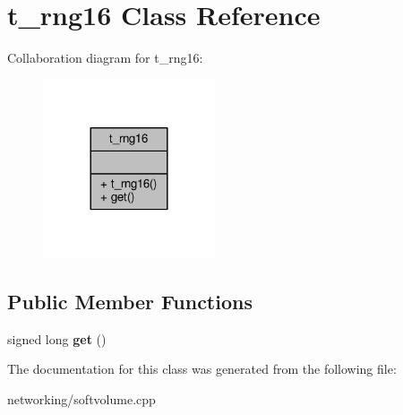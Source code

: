 \hypertarget{classt__rng16}{}\section{t\+\_\+rng16 Class Reference}
\label{classt__rng16}


Collaboration diagram for t\+\_\+rng16\+:
\nopagebreak
\begin{figure}[H]
\begin{center}
\leavevmode
\includegraphics[width=144pt]{da/d35/classt__rng16__coll__graph}
\end{center}
\end{figure}
\subsection*{Public Member Functions}
\begin{DoxyCompactItemize}
\item 
signed long {\bfseries get} ()\hypertarget{classt__rng16_ad3f1f1e0aef90986001783b58dd09005}{}\label{classt__rng16_ad3f1f1e0aef90986001783b58dd09005}

\end{DoxyCompactItemize}


The documentation for this class was generated from the following file\+:\begin{DoxyCompactItemize}
\item 
networking/softvolume.\+cpp\end{DoxyCompactItemize}
